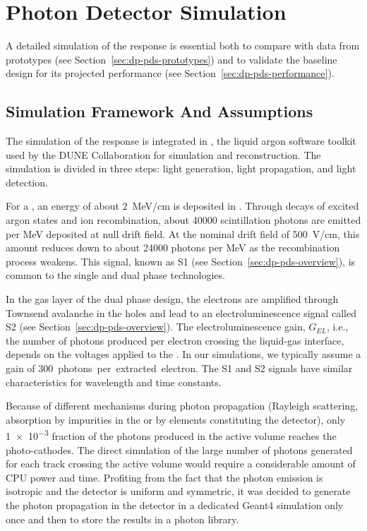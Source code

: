 \section{Photon Detector Simulation}
\label{sec:dp-pds-simulation}

A detailed simulation of the  response is essential both to compare with data from  prototypes (see Section~\ref{sec:dp-pds-prototypes}) and to validate the  baseline design for its projected performance (see Section~\ref{sec:dp-pds-performance}).


\subsection{Simulation Framework And Assumptions}
\label{subsec:dp-pds-simulation_assumptions}

The simulation of the  response is integrated in , the liquid argon software toolkit used by the DUNE Collaboration for simulation and reconstruction. The simulation is divided in three steps: light generation, light propagation, and light detection.

For a , an energy of about \SI{2}{\MeV/\cm} is deposited in . 
Through decays of excited argon states and ion recombination, about \num{40000} scintillation photons are emitted per \si{\MeV} deposited at null drift field. At the nominal drift field of \SI{500}{\V/\cm}, this amount reduces down to about \num{24000} photons per \si{\MeV} as the recombination process weakens. 
This signal, known as S1 (see Section~\ref{sec:dp-pds-overview}), is common to the single and dual phase technologies.

In the gas layer of the dual phase design, the electrons are amplified through Townsend avalanche in the  holes and lead to an electroluminescence signal called S2 (see Section~\ref{sec:dp-pds-overview}). The electroluminescence gain, $G_{EL}$, i.e., the number of photons produced per electron crossing the liquid-gas interface, depends on the voltages applied to the . In our simulations, we typically assume a gain of \SI{300}{photons per extracted electron}. The S1 and S2 signals have similar characteristics for wavelength and time constants. 

Because of different mechanisms during photon propagation (Rayleigh scattering, absorption by impurities in the \lar or by elements constituting the detector), only \num{1e-3} fraction of the photons produced in the \lar active volume reaches the  photo-cathodes. The direct simulation of the large number of photons generated for each track crossing the active volume would require a considerable amount of CPU power and time. Profiting from the fact that the photon emission is isotropic and the detector is uniform and symmetric, it was decided to generate the photon propagation in the detector in a dedicated Geant4 simulation only once and then to store the results in a photon library.

